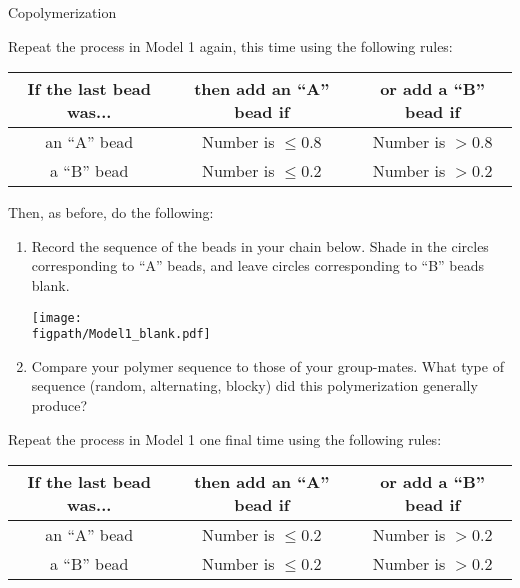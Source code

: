 \begin{activity}{Copolymerization}
\begin{ctqs}
\begin{enumerate}
		\end{enumerate}
		
		\question Repeat the process in Model 1 again, this time using the following rules:	\begin{center}
					\renewcommand{\arraystretch}{1.5}
					\begin{tabular}{|c|c|c|}
						\hline
						\textbf{If the last bead was...} &  \textbf{then add an ``A'' bead if} & \textbf{or add a ``B'' bead if}\\\hline
						 an ``A'' bead & Number is $\leq 0.8$ & Number is $> 0.8$ \\
						 a ``B'' bead & Number is $\leq 0.2$ & Number is $> 0.2$ \\\hline
					\end{tabular}
					\end{center}
	
		Then, as before, do the following:
		\begin{enumerate}
			\item Record the sequence of the beads in your chain below.  Shade in the circles corresponding to ``A'' beads, and leave circles corresponding to ``B'' beads blank.
	
		\vspace{6pt}
		\centerline{\texttt{[image: \\figpath/Model1\_blank.pdf]}}
		
			\item Compare your polymer sequence to those of your group-mates.  What type of sequence (random, alternating, blocky) did this polymerization generally produce?
			
				\begin{solution}[1.5in]
				\end{solution}
		\end{enumerate}
		
	\question Repeat the process in Model 1 one final time using the following rules:	\begin{center}
					\renewcommand{\arraystretch}{1.5}
					\begin{tabular}{|c|c|c|}
						\hline
						\textbf{If the last bead was...} &  \textbf{then add an ``A'' bead if} & \textbf{or add a ``B'' bead if}\\\hline
						 an ``A'' bead & Number is $\leq 0.2$ & Number is $> 0.2$ \\
						 a ``B'' bead & Number is $\leq 0.2$ & Number is $> 0.2$ \\\hline
					\end{tabular}
					\end{center}
	

\end{ctqs}
\end{activity}
